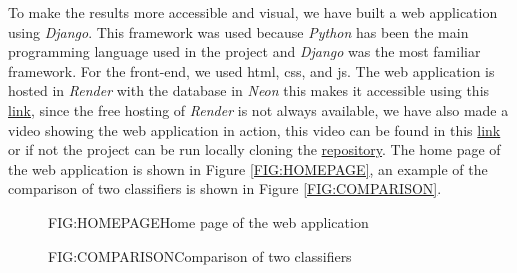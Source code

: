 
To make the results more accessible and visual, we have built a web application using \textit{Django}. This framework was used because \textit{Python} has been the main programming language used in the project and \textit{Django} was the most familiar framework. For the front-end, we used \ac{html}, \ac{css}, and \ac{js}. The web application is hosted in \textit{Render} with the database in \textit{Neon} this makes it accessible using this \href{https://breast-cancer-classification-web.onrender.com/}{link}, since the free hosting of \textit{Render} is not always available, we have also made a video showing the web application in action, this video can be found in this \href{https://www.youtube.com/watch?v=ZASpsVNhXPA}{link} or if not the project can be run locally cloning the \href{https://github.com/LittleHaku/breast-cancer-classification-web}{repository}. The home page of the web application is shown in Figure \ref{FIG:HOMEPAGE}, an example of the comparison of two classifiers is shown in Figure \ref{FIG:COMPARISON}.

\begin{figure}[Web Application]{FIG:HOMEPAGE}{Home page of the web application}
\end{figure}

\begin{figure}[Web Application]{FIG:COMPARISON}{Comparison of two classifiers}
\end{figure}